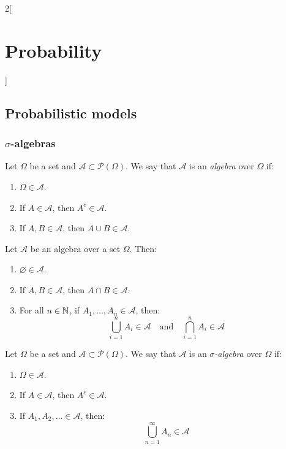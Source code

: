 \documentclass[../../../main.tex]{subfiles}
\begin{document}
\begin{multicols}{2}[\section{Probability}]
  \subsection{Probabilistic models}
  \subsubsection{\texorpdfstring{$\sigma$}{sigma}-algebras}
  \begin{definition}[Algebra]
    Let $\Omega$ be a set and $\mathcal{A}\subset\mathcal{P}(\Omega)$. We say that $\mathcal{A}$ is an \textit{algebra} over $\Omega$ if:
    \begin{enumerate}
      \item $\Omega\in\mathcal{A}$.
      \item If $A\in\mathcal{A}$, then $A^c\in\mathcal{A}$.
      \item If $A,B\in\mathcal{A}$, then $A\cup B\in\mathcal{A}$.
    \end{enumerate}
  \end{definition}
  \begin{prop}
    Let $\mathcal{A}$ be an algebra over a set $\Omega$. Then:
    \begin{enumerate}
      \item $\varnothing\in\mathcal{A}$.
      \item If $A,B\in\mathcal{A}$, then $A\cap B\in\mathcal{A}$.
      \item For all $n\in\mathbb{N}$, if $A_1,\ldots,A_n\in\mathcal{A}$, then: $$\bigcup_{i=1}^nA_i\in\mathcal{A}\quad\text{and}\quad\bigcap_{i=1}^nA_i\in\mathcal{A}$$
    \end{enumerate}
  \end{prop}
  \begin{definition}
    Let $\Omega$ be a set and $\mathcal{A}\subset\mathcal{P}(\Omega)$. We say that $\mathcal{A}$ is an \textit{$\sigma$-algebra} over $\Omega$ if:
    \begin{enumerate}
      \item $\Omega\in\mathcal{A}$.
      \item If $A\in\mathcal{A}$, then $A^c\in\mathcal{A}$.
      \item If $A_1,A_2,\ldots\in\mathcal{A}$, then: $$\bigcup_{n=1}^\infty A_n\in\mathcal{A}$$

\end{enumerate}
\end{definition}
\end{multicols}
\end{document}
